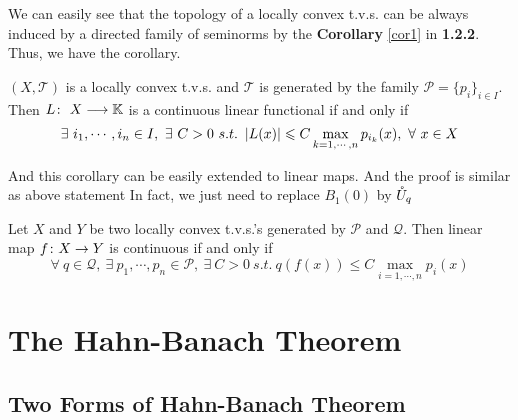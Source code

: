 \documentclass[a4paper,11pt]{report}
\begin{document}
We can easily see that the topology of a locally convex t.v.s. can be always induced by a directed family of seminorms by the \textbf{Corollary} \ref{cor1} in \textbf{1.2.2}. Thus, we have the corollary.

\begin{cor} \label{cor3}
	$(X,\mathscr{T})$ is a locally convex t.v.s. and $\mathscr{T}$ is generated by the family $\mathscr{P} = \{p_i\}_{i \in I}$. Then $L \colon ~ X \longrightarrow \mathbb{K}$ is a continuous linear functional if and only if 
	\begin{equation*}
		\exists ~ i_1,\cdots,i_n \in I,~ \exists ~ C>0 ~s.t.~ \left\lvert L(x)\right\lvert \leqslant C \max_{k=1,\cdots,n} p_{i_k}(x),~ \forall ~ x \in X
	\end{equation*}
\end{cor}

And this corollary can be easily extended to linear maps. And the proof is similar as above statement In fact, we just need to replace $B_1(0)$ by $\mathring{U}_q$
\begin{thm} \label{thm2}
	Let $X$ and $Y$ be two locally convex t.v.s.'s generated by $\mathscr{P}$ and $\mathscr{Q}$. Then linear map $f \colon X \rightarrow Y$ is continuous if and only if 
	\begin{equation*}
		\forall ~ q \in \mathscr{Q},~ \exists ~ p_1,\cdots,p_n \in \mathscr{P},~ \exists ~ C>0 ~s.t.~ q(f(x)) \leqslant C \max_{i=1,\cdots,n} p_i(x)
	\end{equation*}
\end{thm}

\section{The Hahn-Banach Theorem}
\subsection{Two Forms of Hahn-Banach Theorem}
\end{document}
